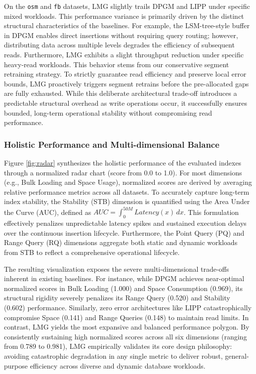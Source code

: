 On the \texttt{osm} and \texttt{fb} datasets, LMG slightly trails DPGM and LIPP under specific mixed workloads. This performance variance is primarily driven by the distinct structural characteristics of the baselines. For example, the LSM-tree-style buffer in DPGM enables direct insertions without requiring query routing; however, distributing data across multiple levels degrades the efficiency of subsequent reads. Furthermore, LMG exhibits a slight throughput reduction under specific heavy-read workloads. This behavior stems from our conservative segment retraining strategy. To strictly guarantee read efficiency and preserve local error bounds, LMG proactively triggers segment retrains before the pre-allocated gaps are fully exhausted. While this deliberate architectural trade-off introduces a predictable structural overhead as write operations occur, it successfully ensures bounded, long-term operational stability without compromising read performance.

\subsubsection{Holistic Performance and Multi-dimensional Balance}
Figure \ref{fig:radar} synthesizes the holistic performance of the evaluated indexes through a normalized radar chart (score from 0.0 to 1.0). For most dimensions (e.g., Bulk Loading and Space Usage), normalized scores are derived by averaging relative performance metrics across all datasets. To accurately capture long-term index stability, the Stability (STB) dimension is quantified using the Area Under the Curve (AUC), defined as $AUC = \int_{0}^{50M} Latency(x) \,dx$. This formulation effectively penalizes unpredictable latency spikes and sustained execution delays over the continuous insertion lifecycle. Furthermore, the Point Query (PQ) and Range Query (RQ) dimensions aggregate both static and dynamic workloads from STB to reflect a comprehensive operational lifecycle.

The resulting visualization exposes the severe multi-dimensional trade-offs inherent in existing baselines. For instance, while DPGM achieves near-optimal normalized scores in Bulk Loading (1.000) and Space Consumption (0.969), its structural rigidity severely penalizes its Range Query (0.520) and Stability (0.602) performance. Similarly, zero error architectures like LIPP catastrophically compromise Space (0.141) and Range Queries (0.148) to maintain read limits. In contrast, LMG yields the most expansive and balanced performance polygon. By consistently sustaining high normalized scores across all six dimensions (ranging from 0.789 to 0.981), LMG empirically validates its core design philosophy: avoiding catastrophic degradation in any single metric to deliver robust, general-purpose efficiency across diverse and dynamic database workloads.

